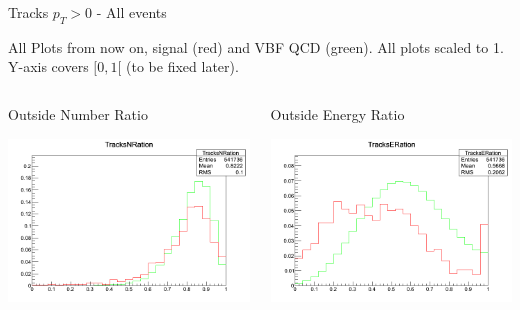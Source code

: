 \documentclass[8pt]{beamer}
\begin{document}
\begin{frame}{Tracks $p_T>0$ - All events}

All Plots from now on, signal (red) and VBF QCD (green). All plots scaled to 1. Y-axis covers $[0,1[$ (to be fixed later).

\begin{columns}
 
\begin{block}{Outside Number Ratio}
 
\includegraphics[width=\linewidth]{img/Tracks0_TracksNRatio.png}

\end{block}

\begin{block}{Outside Energy Ratio}
 
\includegraphics[width=\linewidth]{img/Tracks0_TracksERatio.png}
 
\end{block}

\end{columns}

\end{frame}
\end{document}
